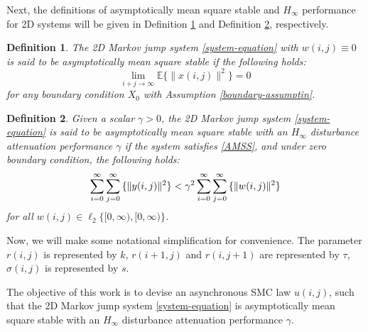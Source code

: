 \documentclass[conference]{IEEEtran}
\newtheorem{definition}{Definition}
\begin{document}
	Next, the definitions of  asymptotically mean square stable and $H_{\infty}$ performance for 2D systems will be given in Definition \ref{mean-square-stable} and Definition \ref{H_infty-performance}, respectively.
	
	\begin{definition}\label{mean-square-stable}
	The 2D Markov jump system \eqref{system-equation} with $w(i,j)\equiv0$ is said to be asymptotically mean square stable if the following holds:
	\begin{equation}\label{AMSS}
			\lim\limits_{i+j\to\infty}\mathbb{E}\{\|x(i,j)\|^{2}\} = 0
	\end{equation}
	for any boundary condition $X_{0}$ with Assumption \ref{boundary-assumptin}.
	\end{definition}


	\begin{definition}\label{H_infty-performance}
		Given a scalar $\gamma>0$, the 2D Markov jump system \eqref{system-equation} is said to be asymptotically mean square stable with an $H_{\infty}$ disturbance attenuation performance $\gamma$ if the system satisfies \eqref{AMSS}, and under zero boundary condition, the following holds:
		\begin{equation} \label{invDef2}
			\sum_{i=0}^{\infty}\sum_{j=0}^{\infty}\mathbb\{\|y(i,j)\|^{2}\} <  \gamma^{2} \sum_{i=0}^{\infty}\sum_{j=0}^{\infty}\mathbb\{\|w(i,j)\|^{2}\}
		\end{equation}
		for all $w(i,j)\in\ell_{2}\{[0,\infty),[0,\infty)\}$.
	\end{definition}
	
	Now, we will make some notational simplification for convenience. The parameter $r(i,j)$ is represented by $k$, $r(i+1,j)$ and $r(i,j+1)$ are represented by $\tau$, $\sigma(i,j)$ is represented by $s$. 
	
	
	
	 The objective of this work is to devise an asynchronous  SMC law $u(i,j)$, such that the 2D Markov jump system \eqref{system-equation} is asymptotically mean square stable with an $H_{\infty}$ disturbance attenuation performance $\gamma$. 
\end{document}
